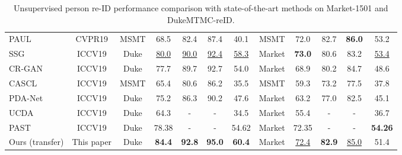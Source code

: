 \documentclass[10pt,twocolumn,letterpaper]{article}
\begin{document}
\begin{table*}
\begin{center}
{\begin{tabular}{l||c||c|c|c|c|c||c|c|c|c|c}
PAUL\cite{Yang_2019_CVPR} & CVPR19 & MSMT & 68.5 & 82.4 & 87.4 & 40.1 & MSMT & 72.0 & 82.7 & \textbf{86.0} & 53.2 \\
SSG\cite{Fu_2019_ICCV} & ICCV19 & Duke & \underline{80.0} & \underline{90.0} & \underline{92.4} & \underline{58.3} & Market & \textbf{73.0} & 80.6 & 83.2 & \underline{53.4} \\
CR-GAN\cite{Chen_2019_ICCV} & ICCV19 & Duke & 77.7 & 89.7 & 92.7 & 54.0 & Market & 68.9 & 80.2 & 84.7 & 48.6 \\
CASCL\cite{Wu_2019_ICCV} & ICCV19 & MSMT & 65.4 & 80.6 & 86.2 & 35.5 & MSMT & 59.3 & 73.2 & 77.5 & 37.8\\
PDA-Net\cite{ Li_2019_ICCV} & ICCV19 & Duke & 75.2 & 86.3 & 90.2 & 47.6 & Market & 63.2 & 77.0 & 82.5 & 45.1\\
UCDA\cite{Qi_2019_ICCV} & ICCV19 & Duke & 64.3 & - & - & 34.5 & Market & 55.4 & - & - & 36.7\\
PAST\cite{Zhang_2019_ICCV} & ICCV19 & Duke & 78.38 & - & - & 54.62 & Market & 72.35 & - & - & \textbf{54.26}\\
\hline
Ours (transfer) & This paper & Duke & \textbf{84.4} & \textbf{92.8} & \textbf{95.0} & \textbf{60.4} &Market & \underline{72.4} & \textbf{82.9}	& \underline{85.0} & 51.4 \\
\hline
\end{tabular}
}
\end{center}
\vspace{-2mm}
\caption{Unsupervised person re-ID performance comparison with state-of-the-art methods on Market-1501 and DukeMTMC-reID.}
\vspace{-2mm}
\label{table:sota-market-duke}
\end{table*}
\end{document}
